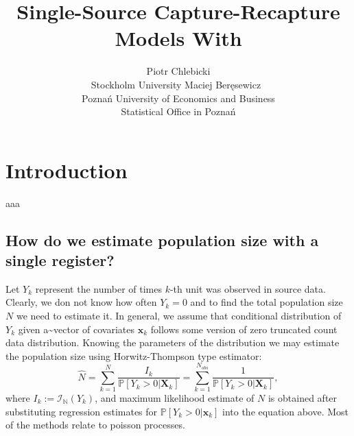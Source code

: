 \documentclass[
]{jss}
\author{
Piotr Chlebicki\\Stockholm University \And Maciej
Beręsewicz~\orcidlink{0000-0002-8281-4301}\\Poznań University of
Economics and Business\\
Statistical Office in Poznań
}
\title{Single-Source Capture-Recapture Models With \pkg{singleRcapture}}
\newcommand{\1}{\mathcal{I}} \newcommand{\bx}{\boldsymbol{x}}
\begin{document}
\section{Introduction}\label{introduction}

aaa

\subsection{How do we estimate population size with a single
register?}\label{how-do-we-estimate-population-size-with-a-single-register}

Let \(Y_{k}\) represent the number of times \(k\)-th unit was observed
in source data. Clearly, we don not know how often \(Y_{k}=0\) and to
find the total population size \(N\) we need to estimate it. In general,
we assume that conditional distribution of \(Y_{k}\) given
a\textasciitilde vector of covariates \(\boldsymbol{x}_{k}\) follows
some version of zero truncated count data distribution. Knowing the
parameters of the distribution we may estimate the population size using
Horwitz-Thompson type estimator: \begin{equation*}
    \hat{N}=
    \sum_{k=1}^{N}\frac{I_{k}}{\mathbb{P}[Y_{k}>0|\boldsymbol{X}_{k}]}=
    \sum_{k=1}^{N_{obs}}\frac{1}{\mathbb{P}[Y_{k}>0|\boldsymbol{X}_{k}]},
\end{equation*} where \(I_{k}:=\mathcal{I}_{\mathbb{N}}(Y_{k})\), and
maximum likelihood estimate of \(N\) is obtained after substituting
regression estimates for \(\mathbb{P}[Y_{k}>0|\boldsymbol{x}_{k}]\) into
the equation above. Most of the methods relate to poisson processes.
\end{document}
